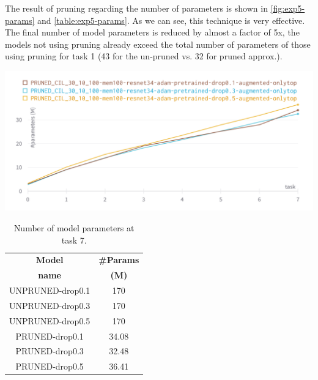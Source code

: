 The result of pruning regarding the number of parameters is shown in \autoref{fig:exp5-params} and \autoref{table:exp5-params}. As we can see, this technique is very effective. The final number of model parameters is reduced by almost a factor of 5x, the models not using pruning already exceed the total number of parameters of those using pruning for task 1 (43 for the un-pruned vs. 32 for pruned approx.).

\begin{table}[ht]
    \begin{minipage}[b]{0.49\linewidth}
        \centering
        \includegraphics[width=1\linewidth]{images/exp/exp5-params.png}
        \label{fig:exp5-params}
    \end{minipage}
    \hfill
    \begin{minipage}[b]{0.49\linewidth}
        \centering
        \begin{tabular}{c|c}
            \hline
            \textbf{Model} &
            \textbf{\#Params} \\
            \textbf{name} &
            \textbf{(M)} \\
            \hline
            \hline
UNPRUNED-drop0.1&170\\
UNPRUNED-drop0.3&170\\
UNPRUNED-drop0.5&170\\
\hline
PRUNED-drop0.1&34.08\\
PRUNED-drop0.3&32.48\\
PRUNED-drop0.5&36.41\\
            \hline
        \end{tabular}
            \caption{Number of model parameters at task 7.}
            \label{table:exp5-params}
    \end{minipage}
\end{table}

